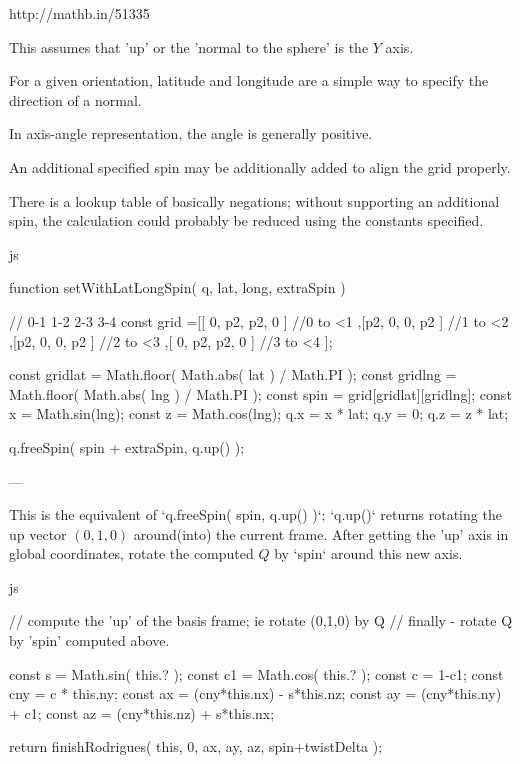 http://mathb.in/51335

This assumes that 'up' or the 'normal to the sphere' is the $Y$ axis.

For a given orientation, latitude and longitude are a simple way to specify the direction of a normal.  

In axis-angle representation, the angle is generally positive.

An additional specified spin may be additionally added to align the grid properly.

There is a lookup table of basically negations; without supporting an additional spin, the calculation could probably be reduced using the constants specified.

js

	function setWithLatLongSpin( q, lat, long, extraSpin )

	{
		          //  0-1 1-2 2-3 3-4
		const grid =[[ 0, p2, p2,  0 ]  //0 to <1
		            ,[p2,  0,  0, p2 ]  //1 to <2
		            ,[p2,  0,  0, p2 ]  //2 to <3
		            ,[ 0, p2, p2,  0 ]  //3 to <4
		            ];

		const gridlat = Math.floor( Math.abs( lat ) / Math.PI );
		const gridlng = Math.floor( Math.abs( lng ) / Math.PI );
		const spin = grid[gridlat][gridlng];
		const x = Math.sin(lng);
		const z = Math.cos(lng);
		q.x = x * lat; 
		q.y = 0;
		q.z = z * lat;

		q.freeSpin( spin + extraSpin, q.up() );
	}

---

This is the equivalent of `q.freeSpin( spin, q.up() )`; `q.up()` returns rotating the up vector $(0,1,0)$ around(into) the current frame.  After getting the 'up' axis in global coordinates, rotate the computed $Q$ by `spin` around this new axis.

js

	// compute the 'up' of the basis frame; ie rotate (0,1,0) by Q
	// finally - rotate Q by 'spin' computed above.
	{
		const s = Math.sin( this.? );
		const c1 = Math.cos( this.? );
		const c = 1-c1;
		const cny = c * this.ny;
		const ax = (cny*this.nx) - s*this.nz;
		const ay = (cny*this.ny) + c1;
		const az = (cny*this.nz) + s*this.nx;

		return finishRodrigues( this, 0, ax, ay, az, spin+twistDelta );
	}

